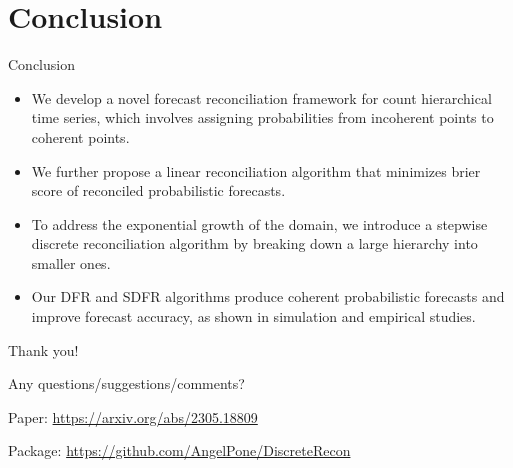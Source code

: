 \documentclass[12pt]{beamer}
\begin{document}
\section{Conclusion}

\begin{frame}{Conclusion}
    \begin{itemize}
        \item We develop a novel forecast reconciliation framework for count hierarchical time series, which involves assigning probabilities from incoherent points to coherent points.
        \item We further propose a linear reconciliation algorithm that minimizes brier score of reconciled probabilistic forecasts.
        \item To address the exponential growth of the domain, we introduce a stepwise discrete reconciliation algorithm by breaking down a large hierarchy into smaller ones.
        \item Our DFR and SDFR algorithms produce coherent probabilistic forecasts and improve forecast accuracy, as shown in simulation and empirical studies.
    \end{itemize}
\end{frame}


\begin{frame}

\begin{minipage}[t][0.8\textheight][c]{\textwidth}
\centering
\fontsize{15}{18}\selectfont
Thank you!

Any questions/suggestions/comments?    

\end{minipage}


Paper: \url{https://arxiv.org/abs/2305.18809}

Package: \url{https://github.com/AngelPone/DiscreteRecon}
\end{frame}
\end{document}
